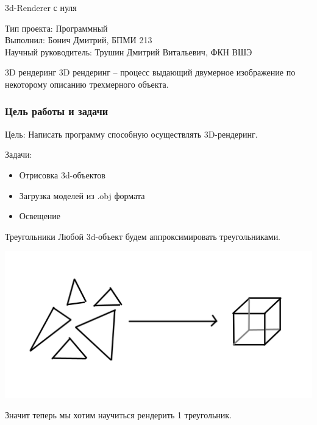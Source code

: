 \documentclass{beamer}
\title{}
\date{2023}
\author{Бонич Дмитрий}
\begin{document}
\begin{frame}
\begin{center}


{\large \scshape

\bigskip

\bigskip

3d-Renderer с нуля

\bigskip
\bigskip
\bigskip
\bigskip
\bigskip
\bigskip
}

Тип проекта: Программный\\
\bigskip
Выполнил: Бонич Дмитрий, БПМИ 213\\
\bigskip
Научный руководитель: Трушин Дмитрий Витальевич, ФКН ВШЭ 

\end{center}
\end{frame}

\begin{frame}{3D рендеринг}
    3D рендеринг -- процесс выдающий 
    двумерное изображение по некоторому описанию трехмерного объекта.
\end{frame}

\begin{frame}

\frametitle{Цель работы и задачи}

Цель: Написать программу способную осуществлять 3D-рендеринг.

\bigskip

Задачи:
\begin{itemize}
    \item Отрисовка 3d-объектов
    \item Загрузка моделей из .obj формата
    \item Освещение
\end{itemize}

\end{frame}

\begin{frame}{Треугольники}
Любой 3d-объект будем аппроксимировать треугольниками.

\begin{center}
\includegraphics[width=0.6 \linewidth]{triangles.png}
\end{center}

Значит теперь мы хотим научиться рендерить 1 треугольник.

\end{frame}
\end{document}

